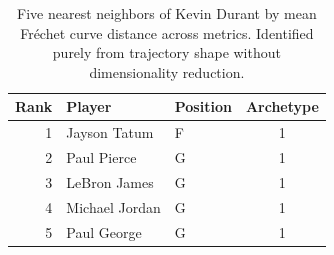 \begin{table}[htbp]
  \centering\small
  \begin{tabular}{rllc}
    \toprule
    Rank & Player & Position & Archetype \\
    \midrule
    1 & Jayson Tatum & F & 1 \\
    2 & Paul Pierce & G & 1 \\
    3 & LeBron James & G & 1 \\
    4 & Michael Jordan & G & 1 \\
    5 & Paul George & G & 1 \\
    \bottomrule
  \end{tabular}
  \caption{Five nearest neighbors of Kevin Durant by mean Fr\'{e}chet curve distance across metrics. Identified purely from trajectory shape without dimensionality reduction.}
  \label{tab:Kevin_Durant_frechet_curve_neighbors}
\end{table}

